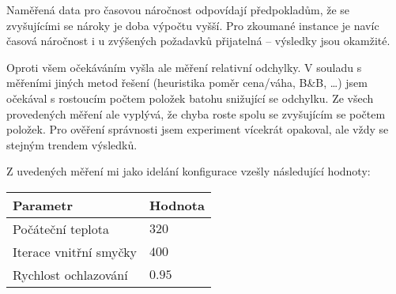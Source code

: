\documentclass[czech]{article}
\begin{document}
Naměřená data pro časovou náročnost odpovídají předpokladům, že se zvyšujícími se nároky je doba výpočtu vyšší.
Pro zkoumané instance je navíc časová náročnost i u zvýšených požadavků přijatelná -- výsledky jsou okamžité.

Oproti všem očekáváním vyšla ale měření relativní odchylky.
V souladu s měřeními jiných metod řešení (heuristika poměr cena/váha, B\&B, \dots) jsem očekával s rostoucím počtem položek batohu snižující se odchylku.
Ze všech provedených měření ale vyplývá, že chyba roste spolu se zvyšujícím se počtem položek.
Pro ověření správnosti jsem experiment vícekrát opakoval, ale vždy se stejným trendem výsledků.

Z uvedených měření mi jako idelání konfigurace vzešly následující hodnoty: \\


\begin{tabular}{ | l | l | }
    \hline
    Parametr & Hodnota \\ \hline \hline
    Počáteční teplota & $320$ \\
    Iterace vnitřní smyčky & $400$ \\
    Rychlost ochlazování & $0.95$ \\ \hline
\end{tabular}
\end{document}
